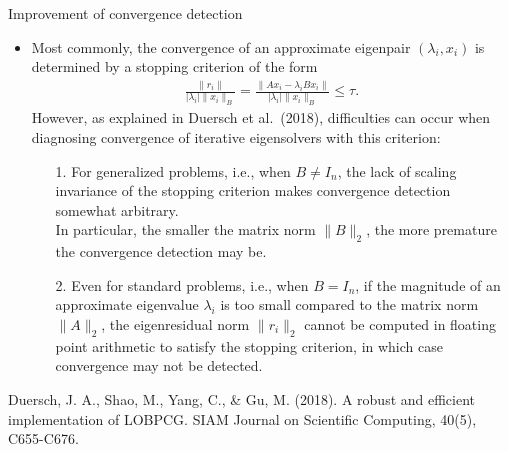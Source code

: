 \documentclass[t,usepdftitle=false]{beamer}
\begin{document}
\begin{frame}{Improvement of convergence detection}
	\label{convergence}
	\begin{itemize}
	\item Most commonly, the convergence of an approximate eigenpair $(\lambda_i,x_i)$ is determined by a stopping criterion of the form
	\begin{align*}
	\frac{\|r_i\|}{|\lambda_i|\|x_i\|_B}=\frac{\|Ax_i-\lambda_iBx_i\|}{|\lambda_i|\|x_i\|_B}\leq\tau.
	\end{align*}
	However, as explained in Duersch et al.~(2018), difficulties can occur when diagnosing convergence of iterative eigensolvers with this criterion:\tinyskip\\
	\begin{enumerate}
	\item[1.] For generalized problems, i.e., when $B\neq I_n$, the lack of scaling invariance of the stopping criterion makes convergence detection somewhat arbitrary.\tinyskip\\
	In particular, the smaller the matrix norm $\|B\|_2$, the more premature the convergence detection may be.\tinyskip
	\item[2.] Even for standard problems, i.e., when $B=I_n$, if the magnitude of an approximate eigenvalue $\lambda_i$ is too small compared to the matrix norm $\|A\|_2$, the eigenresidual norm $\|r_i\|_2$ cannot be computed in floating point arithmetic to satisfy the stopping criterion, in which case convergence may not be detected.
	\end{enumerate}
	\end{itemize}
	\smallskip
	\tiny{Duersch, J. A., Shao, M., Yang, C., \& Gu, M. (2018). A robust and efficient implementation of LOBPCG. SIAM Journal on Scientific Computing, 40(5), C655-C676.}
\end{frame}
\end{document}
